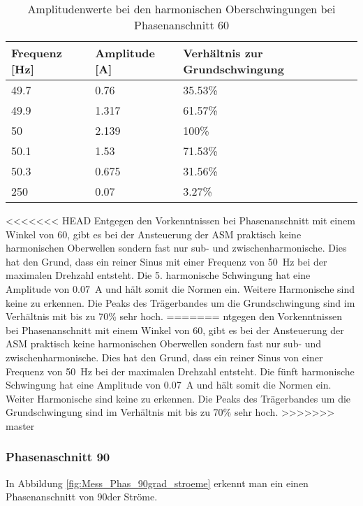 \begin{table}[ht!]
	\centering
	\begin{tabular}{|l|l|l|}
		\hline
		Frequenz {[}Hz{]} & Amplitude {[}A{]} & Verhältnis zur Grundschwingung	\\ \hline
		49.7              & 0.76              & 35.53\%							\\ \hline
		49.9              & 1.317             & 61.57\%							\\ \hline
		50                & 2.139             & 100\%							\\ \hline
		50.1              & 1.53              & 71.53\%							\\ \hline
		50.3              & 0.675             & 31.56\%							\\ \hline
		250               & 0.07              & 3.27\%							\\ \hline
	\end{tabular}
	\caption{Amplitudenwerte bei den harmonischen Oberschwingungen bei Phasenanschnitt 60\textdegree}\label{tab:Phas_60_ASM_stroeme}
\end{table}
<<<<<<< HEAD
Entgegen den Vorkenntnissen bei Phasenanschnitt mit einem Winkel von 60\textdegree, gibt es bei der Ansteuerung der ASM praktisch keine harmonischen Oberwellen sondern fast nur sub- und zwischenharmonische. Dies hat den Grund, dass ein reiner Sinus mit einer Frequenz von \SI{50}{Hz} bei der maximalen Drehzahl entsteht. Die 5. harmonische Schwingung hat eine Amplitude von \SI{0.07}{A} und hält somit die Normen ein. Weitere Harmonische sind keine zu erkennen. Die Peaks des Trägerbandes um die Grundschwingung sind im Verhältnis mit bis zu 70\% sehr hoch.
=======
ntgegen den Vorkenntnissen bei Phasenanschnitt mit einem Winkel von 60\textdegree, gibt es bei der Ansteuerung der ASM praktisch keine harmonischen Oberwellen sondern fast nur sub- und zwischenharmonische. Dies hat den Grund, dass ein reiner Sinus von einer Frequenz von \SI{50}{Hz} bei der maximalen Drehzahl entsteht. Die fünft harmonische Schwingung hat eine Amplitude von \SI{0.07}{A} und hält somit die Normen ein. Weiter Harmonische sind keine zu erkennen. Die Peaks des Trägerbandes um die Grundschwingung sind im Verhältnis mit bis zu 70\% sehr hoch.
>>>>>>> master

\newpage
\subsubsection*{Phasenaschnitt 90\textdegree}

In Abbildung \ref{fig:Mess_Phas_90grad_stroeme} erkennt man ein einen Phasenanschnitt von 90\textdegree der Ströme.

